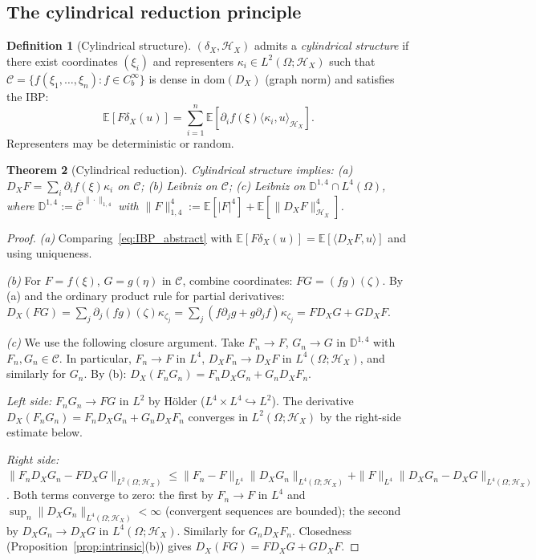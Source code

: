 \documentclass[11pt,a4paper]{article}
\theoremstyle{plain}
\newtheorem{theorem}{Theorem}[section]
\theoremstyle{definition}
\newtheorem{definition}[theorem]{Definition}
\theoremstyle{remark}
\newcommand{\E}{\mathbb{E}}
\newcommand{\dom}{\mathrm{dom}}
\newcommand{\HX}{\mathcal{H}_X}
\begin{document}
\subsection{The cylindrical reduction principle}

\begin{definition}[Cylindrical structure]\label{def:cyl}
$(\delta_X,\HX)$ admits a \emph{cylindrical structure} if there exist coordinates $(\xi_i)$ and representers $\kappa_i \in L^2(\Omega;\HX)$ such that $\mathcal{C} = \{f(\xi_1,\ldots,\xi_n) : f \in C_b^\infty\}$ is dense in $\dom(D_X)$ (graph norm) and satisfies the IBP:
\begin{equation}\label{eq:IBP_abstract}
\E[F\delta_X(u)] = \sum_{i=1}^n\E[\partial_if(\xi)\langle\kappa_i,u\rangle_{\HX}].
\end{equation}
Representers may be deterministic or random.
\end{definition}

\begin{theorem}[Cylindrical reduction]\label{thm:cylred}
Cylindrical structure implies: (a) $D_XF = \sum_i\partial_if(\xi)\kappa_i$ on $\mathcal{C}$; (b) Leibniz on $\mathcal{C}$; (c) Leibniz on $\mathbb{D}^{1,4}\cap L^4(\Omega)$, where $\mathbb{D}^{1,4} := \overline{\mathcal{C}}^{\|\cdot\|_{1,4}}$ with $\|F\|_{1,4}^4 := \E[|F|^4]+\E[\|D_XF\|^4_{\HX}]$.
\end{theorem}

\begin{proof}
\emph{(a)} Comparing~\eqref{eq:IBP_abstract} with $\E[F\delta_X(u)] = \E[\langle D_XF,u\rangle]$ and using uniqueness.

\emph{(b)} For $F = f(\xi)$, $G = g(\eta)$ in $\mathcal{C}$, combine coordinates: $FG = (fg)(\zeta)$. By (a) and the ordinary product rule for partial derivatives: $D_X(FG) = \sum_j\partial_j(fg)(\zeta)\kappa_{\zeta_j} = \sum_j(f\partial_jg+g\partial_jf)\kappa_{\zeta_j} = FD_XG+GD_XF$.

\emph{(c)} We use the following closure argument. Take $F_n \to F$, $G_n \to G$ in $\mathbb{D}^{1,4}$ with $F_n,G_n \in \mathcal{C}$. In particular, $F_n \to F$ in $L^4$, $D_XF_n \to D_XF$ in $L^4(\Omega;\HX)$, and similarly for $G_n$. By (b): $D_X(F_nG_n) = F_nD_XG_n+G_nD_XF_n$. 

\emph{Left side:} $F_nG_n \to FG$ in $L^2$ by H\"older ($L^4 \times L^4 \hookrightarrow L^2$). The derivative $D_X(F_nG_n) = F_nD_XG_n+G_nD_XF_n$ converges in $L^2(\Omega;\HX)$ by the right-side estimate below.

\emph{Right side:} $\|F_nD_XG_n - FD_XG\|_{L^2(\Omega;\HX)} \le \|F_n-F\|_{L^4}\|D_XG_n\|_{L^4(\Omega;\HX)} + \|F\|_{L^4}\|D_XG_n-D_XG\|_{L^4(\Omega;\HX)}$. Both terms converge to zero: the first by $F_n \to F$ in $L^4$ and $\sup_n\|D_XG_n\|_{L^4(\Omega;\HX)} < \infty$ (convergent sequences are bounded); the second by $D_XG_n \to D_XG$ in $L^4(\Omega;\HX)$. Similarly for $G_nD_XF_n$. Closedness (Proposition~\ref{prop:intrinsic}(b)) gives $D_X(FG) = FD_XG+GD_XF$.
\end{proof}
\end{document}
